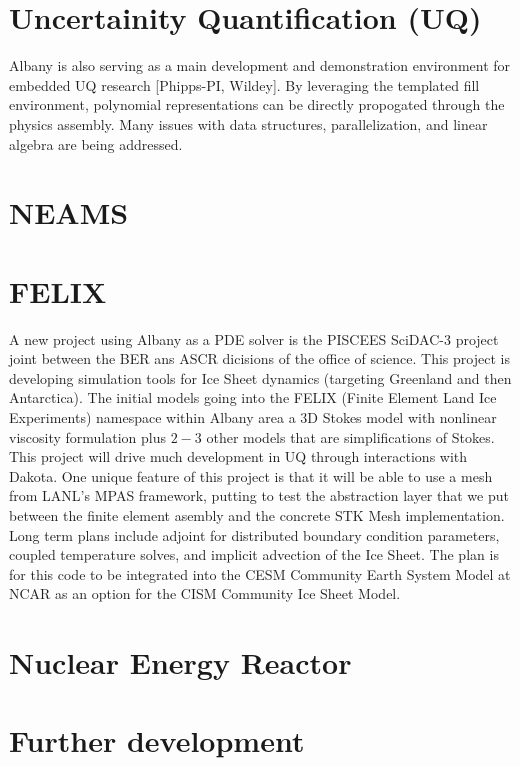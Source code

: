 \documentclass[pdf,12pt,report,strict]{SANDreport}
\theoremstyle{remark}
\begin{document}
\section {Uncertainity Quantification (UQ)}
Albany is also serving as a main development and demonstration
environment for embedded UQ research [Phipps-PI, Wildey]. By
leveraging the templated fill environment, polynomial representations
can be directly propogated through the physics assembly. Many issues
with data structures, parallelization, and linear algebra are being
addressed.  

\section{NEAMS}

\section{FELIX}
A new project using Albany as a PDE solver is the PISCEES SciDAC-3 project
joint between the BER ans ASCR dicisions of the office of science. This
project is developing simulation tools for Ice Sheet dynamics (targeting
Greenland and then Antarctica). The initial models going into the FELIX
(Finite Element Land Ice Experiments) namespace within Albany area
a 3D Stokes model with nonlinear viscosity
formulation plus $2-3$ other models that are simplifications of Stokes.
This project will drive much development in UQ through interactions 
with Dakota. One unique feature of this project is that it will be able
to use a mesh from LANL's MPAS framework, putting to test the abstraction
layer that we put between the finite element asembly and the concrete
STK Mesh implementation. Long term plans include adjoint for distributed
boundary condition parameters, coupled temperature solves, and implicit
advection of the Ice Sheet. The plan is for this code to be integrated
into the CESM Community Earth System Model at NCAR as an option for the
CISM Community Ice Sheet Model.

\section{Nuclear Energy Reactor}

\section{Further development}
\end{document}
